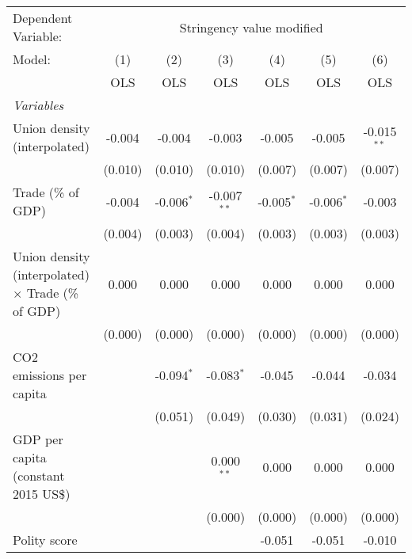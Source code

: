 
\begingroup
\centering
\begin{tabular}{lcccccc}
   \toprule
   Dependent Variable: & \multicolumn{6}{c}{Stringency value modified}\\
   Model:                                                    & (1)     & (2)          & (3)           & (4)          & (5)          & (6)\\  
                                                             &  OLS    & OLS          & OLS           & OLS          & OLS          & OLS\\  
   \midrule
   \emph{Variables}\\
   Union density (interpolated)                              & -0.004  & -0.004       & -0.003        & -0.005       & -0.005       & -0.015$^{**}$\\   
                                                             & (0.010) & (0.010)      & (0.010)       & (0.007)      & (0.007)      & (0.007)\\   
   Trade (\% of GDP)                                         & -0.004  & -0.006$^{*}$ & -0.007$^{**}$ & -0.005$^{*}$ & -0.006$^{*}$ & -0.003\\   
                                                             & (0.004) & (0.003)      & (0.004)       & (0.003)      & (0.003)      & (0.003)\\   
   Union density (interpolated) $\times$ Trade (\% of GDP)   & 0.000   & 0.000        & 0.000         & 0.000        & 0.000        & 0.000\\   
                                                             & (0.000) & (0.000)      & (0.000)       & (0.000)      & (0.000)      & (0.000)\\   
   CO2 emissions per capita                                  &         & -0.094$^{*}$ & -0.083$^{*}$  & -0.045       & -0.044       & -0.034\\   
                                                             &         & (0.051)      & (0.049)       & (0.030)      & (0.031)      & (0.024)\\   
   GDP per capita (constant 2015 US\$)                       &         &              & 0.000$^{**}$  & 0.000        & 0.000        & 0.000\\   
                                                             &         &              & (0.000)       & (0.000)      & (0.000)      & (0.000)\\   
   Polity score                                              &         &              &               & -0.051       & -0.051       & -0.010\\   

\end{tabular}
